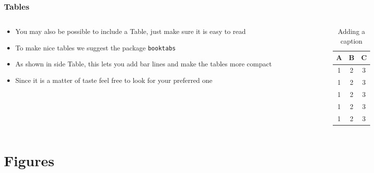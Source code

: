 \documentclass[
    10pt,
    aspectratio=169,
    xcolor={dvipsnames},
    spanish,
    ]{beamer}
\begin{document}
\begin{frame}
  \frametitle{Tables}
  \centering
  \begin{columns}
    \begin{column}{0.5\textwidth}
      \begin{itemize}
        \item You may also be possible to include a Table, just make sure it is easy to read
        \item To make nice tables we suggest the package \texttt{booktabs}
        \item As shown in side Table, this lets you add bar lines and make the tables more compact
        \item Since it is a matter of taste feel free to look for your preferred one
      \end{itemize}
    \end{column}
    \begin{column}{0.4\textwidth}
      \begin{table}[t]
        \centering
        \begin{tabular}{ccc}
            \toprule
            \textbf{A} & \textbf{B} & \textbf{C} \\ \midrule
            1 & 2 & 3 \\
            1 & 2 & 3 \\
            1 & 2 & 3 \\
            1 & 2 & 3 \\
            1 & 2 & 3 \\
            \bottomrule
        \end{tabular}
        \caption{Adding a caption}
    \end{table}
    \end{column}
  \end{columns}  
\end{frame}

\section{Figures}
\end{document}
